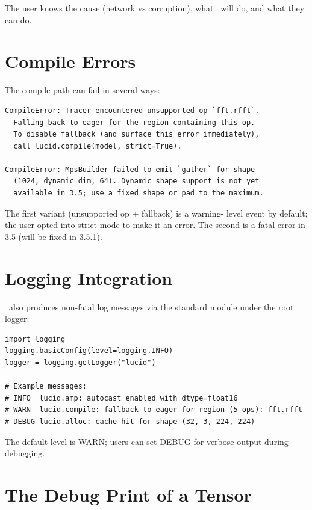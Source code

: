 The user knows the cause (network vs corruption), what
\Lucid\ will do, and what they can do.

\section{Compile Errors}
\label{sec:error_handling:compile_errors}

The compile path can fail in several ways:

\begin{lstlisting}[style=lucid,language=LucidPython]
CompileError: Tracer encountered unsupported op `fft.rfft`.
  Falling back to eager for the region containing this op.
  To disable fallback (and surface this error immediately),
  call lucid.compile(model, strict=True).

CompileError: MpsBuilder failed to emit `gather` for shape
  (1024, dynamic_dim, 64). Dynamic shape support is not yet
  available in 3.5; use a fixed shape or pad to the maximum.
\end{lstlisting}

The first variant (unsupported op + fallback) is a warning-
level event by default; the user opted into strict mode to
make it an error. The second is a fatal error in 3.5 (will be
fixed in 3.5.1).

\section{Logging Integration}
\label{sec:error_handling:logging}

\Lucid\ also produces non-fatal log messages via the standard
 module under the  root logger:

\begin{lstlisting}[style=lucid,language=LucidPython]
import logging
logging.basicConfig(level=logging.INFO)
logger = logging.getLogger("lucid")

# Example messages:
# INFO  lucid.amp: autocast enabled with dtype=float16
# WARN  lucid.compile: fallback to eager for region (5 ops): fft.rfft
# DEBUG lucid.alloc: cache hit for shape (32, 3, 224, 224)
\end{lstlisting}

The default level is WARN; users can set DEBUG for verbose
output during debugging.

\section{The Debug Print of a Tensor}
\label{sec:error_handling:tensor_debug_print}

